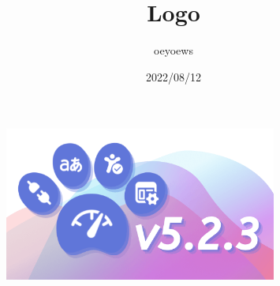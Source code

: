 \documentclass[UTF8]{article}
\title{Logo \emoji{rocket}}
\author{oeyoews}
\date{2022/08/12}
\begin{document}
\maketitle

\begin{figure}[htpb]
	\centering
	\includegraphics[width=0.8\textwidth]{img/logo.png}
	\label{fig:img-logo-png}
\end{figure}
\end{document}
